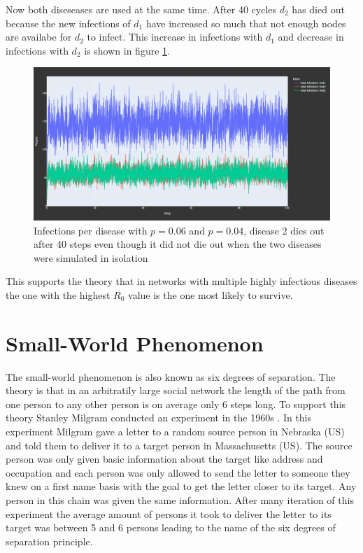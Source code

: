 Now both diseseases are used at the same time. After 40 cycles
$d_2$ has died out because the new infections of $d_1$ have increased so much that
not enough nodes are availabe for $d_2$ to infect. This increase in infections with $d_1$ and
decrease in infections with $d_2$ is shown in figure \ref{fig:exp_multiple_diseases}.

\begin{figure}
    \centering
    \includegraphics[width=0.5\linewidth]{images/exp_subgroups.png}
    \caption{Infections per disease with $p = 0.06$ and $p = 0.04$, disease 2 dies out after 40 steps even though it did not die out when the two diseases were simulated in isolation}
    \label{fig:exp_multiple_diseases}
\end{figure}

This supports the theory that in networks with multiple highly infectious diseases the
one with the highest $R_0$ value is the one most likely to survive.

\section{Small-World Phenomenon}
The small-world phenomenon is also known as six degrees of separation. The theory is that
in an arbitratily large social network the length of the path from one person to any other
person is on average only 6 steps long. To support this theory Stanley Milgram conducted
an experiment in the 1960s \cite{smallWorld}. In this experiment Milgram gave a letter to 
a random source person in Nebraska (US) and told them to deliver it to a target person in
Massachusetts (US). The source person was only given basic information about the target like 
address and occupation and each person was only allowed to send the letter to someone they
knew on a first name basis with the goal to get the letter closer to its target. Any person
in this chain was given the same information. After many iteration of this experiment the 
average amount of persons it took to deliver the letter to its target was between 5 and 6 persons
leading to the name of the six degrees of separation principle.

